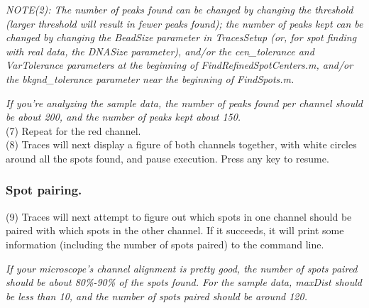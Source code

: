 \documentclass[11pt]{article}
\begin{document}
{\it NOTE(2): The number of peaks found can be changed by changing the threshold (larger threshold will result in fewer peaks found); the number of peaks kept can be changed by changing the BeadSize parameter in TracesSetup (or, for spot finding with real data, the DNASize parameter), and/or the cen\_tolerance and VarTolerance parameters at the beginning of FindRefinedSpotCenters.m, and/or the bkgnd\_tolerance parameter near the beginning of FindSpots.m.}  

{\it If you're analyzing the sample data, the number of peaks found per channel should be about 200, and the number of peaks kept about 150.}\\

\noindent (7) Repeat for the red channel.\\

\noindent (8) Traces will next display a figure of both channels together, with white circles around all the spots found, and pause execution. Press any key to resume.


\subsubsection{Spot pairing.}

\noindent (9) Traces will next attempt to figure out which spots in one channel should be paired with which spots in the other channel. If it succeeds, it will print some information (including the number of spots paired) to the command line.

{\it If your microscope's channel alignment is pretty good, the number of spots paired should be about 80\%-90\% of the spots found. For the sample data, maxDist should be less than 10, and the number of spots paired should be around 120.}\\
\end{document}
